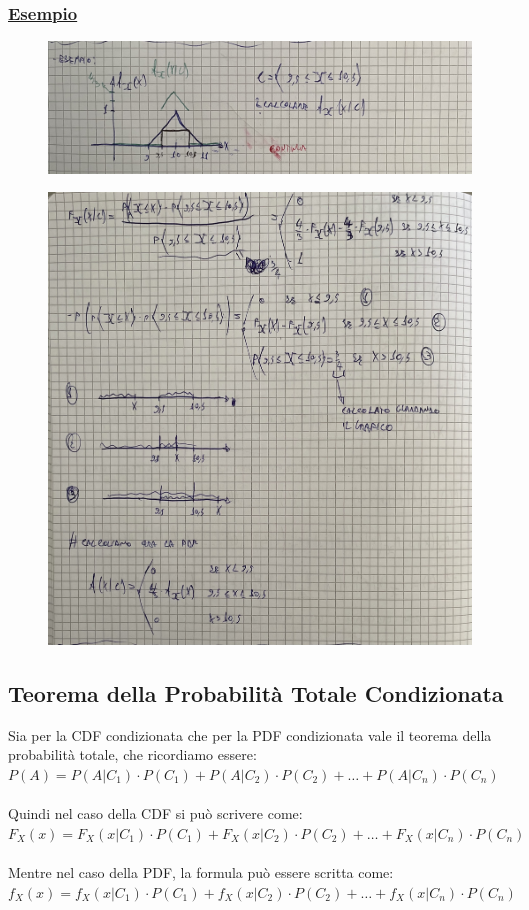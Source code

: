 \documentclass{article}
\begin{document}
\subsubsection{\underline{Esempio}}
\begin{figure}[ht]
\centering
\includegraphics[scale=0.12]{ese/23.jpeg}
\end{figure}
\begin{figure}[ht]
\centering
\includegraphics[scale=0.17]{ese/23a.jpeg}
\end{figure} 
\clearpage
\subsection{Teorema della Probabilità Totale Condizionata}
Sia per la CDF condizionata che per la PDF condizionata vale il teorema della probabilità totale, che ricordiamo essere: \\
$P(A) = P(A|C_1) \cdot P(C_1) + P(A|C_2) \cdot P(C_2) + \dots + P(A|C_n) \cdot P(C_n)$ \\ \\
Quindi nel caso della CDF si può scrivere come: \\
$F_X(x) = F_X(x|C_1) \cdot P(C_1) + F_X(x|C_2) \cdot P(C_2) + \dots + F_X(x|C_n) \cdot P(C_n)$ \\ \\
Mentre nel caso della PDF, la formula può essere scritta come: \\
$f_X(x) = f_X(x|C_1) \cdot P(C_1) + f_X(x|C_2) \cdot P(C_2) + \dots + f_X(x|C_n) \cdot P(C_n)$
\end{document}
